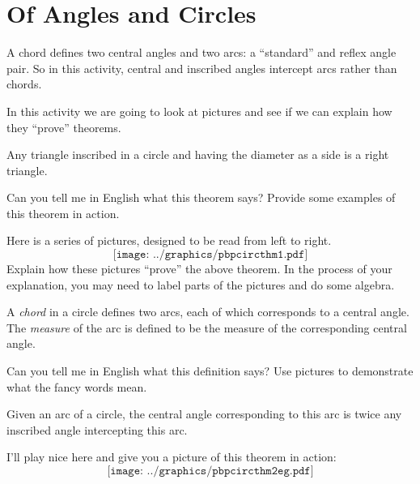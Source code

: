 \newpage
\section{Of Angles and Circles} %

\begin{teachingnote}
A chord defines two central angles and two arcs: a ``standard'' and reflex angle pair.  So in this activity, central and inscribed angles intercept arcs rather than chords.
\end{teachingnote}

In this activity we are going to look at pictures and see if we can
explain how they ``prove'' theorems.

\begin{theorem} 
Any triangle inscribed in a circle and having the diameter as a side is a
right triangle.
\end{theorem}

\begin{prob}
Can you tell me in English what this theorem says? Provide some
examples of this theorem in action.
\end{prob}

\begin{prob} 
Here is a series of pictures, designed to be read from left to right.
\[
\texttt{[image: ../graphics/pbpcircthm1.pdf]}
\]
Explain how these pictures ``prove'' the above theorem. In the process
of your explanation, you may need to label parts of the pictures and
do some algebra.
\end{prob}

\begin{definition}
A \emph{chord} in a circle defines two {arcs}, each of which corresponds to a {central angle}.  The \emph{measure} of the arc is defined to be the measure of the corresponding central angle.  
\end{definition}

\begin{prob}
Can you tell me in English what this definition says? Use pictures to demonstrate what the fancy words mean.  
\end{prob}

\begin{theorem} 
Given an arc of a circle, the central angle corresponding to this arc is
twice any inscribed angle intercepting this arc.
\end{theorem}

I'll play nice here and give you a picture of this theorem in action:
\[
\texttt{[image: ../graphics/pbpcircthm2eg.pdf]}
\]

